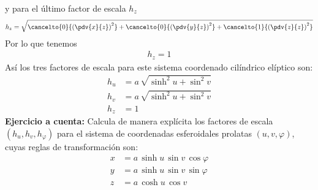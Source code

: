 y para el último factor de escala $h_{z}$
\begin{align*}
h_{z} = \sqrt{ \cancelto{0}{\left( \pdv{x}{z} \right)^{2}} + \cancelto{0}{\left( \pdv{y}{z} \right)^{2}} + \cancelto{1}{\left( \pdv{z}{z} \right)^{2}}}
\end{align*}
Por lo que tenemos
\begin{align*}
h_{z} = 1
\end{align*}
Así los tres factores de escala para este sistema coordenado cilíndrico elíptico son:
\begin{align*}
h_{u} &= a \, \sqrt{ \sinh^{2} u + \sin^{2} v} \\[1em]
h_{v} &= a \, \sqrt{ \sinh^{2} u + \sin^{2} v} \\[1em]
h_{z} &= 1
\end{align*}
\textbf{Ejercicio a cuenta: } Calcula de manera explícita los factores de escala $(h_{u}, h_{v}, h_{\varphi})$ para el sistema de coordenadas esferoidales prolatas $(u, v, \varphi)$, cuyas reglas de transformación son:
\begin{align*}
x &= a \, \sinh u \, \sin v \, \cos \varphi \\
y &= a \, \sinh u \, \sin v \, \sin \varphi \\
z &= a \, \cosh u \, \cos v
\end{align*}